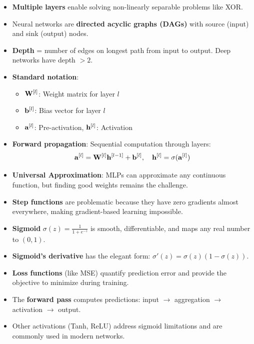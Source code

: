 \begin{itemize}
    \item \textbf{Multiple layers} enable solving non-linearly separable problems like XOR.
    
    \item Neural networks are \textbf{directed acyclic graphs (DAGs)} with source (input) and sink (output) nodes.
    
    \item \textbf{Depth} = number of edges on longest path from input to output. Deep networks have depth $> 2$.
    
    \item \textbf{Standard notation}:
    \begin{itemize}
        \item $\mathbf{W}^{[l]}$: Weight matrix for layer $l$
        \item $\mathbf{b}^{[l]}$: Bias vector for layer $l$
        \item $\mathbf{a}^{[l]}$: Pre-activation, $\mathbf{h}^{[l]}$: Activation
    \end{itemize}
    
    \item \textbf{Forward propagation}: Sequential computation through layers:
    \[
    \mathbf{a}^{[l]} = \mathbf{W}^{[l]} \mathbf{h}^{[l-1]} + \mathbf{b}^{[l]}, \quad \mathbf{h}^{[l]} = \sigma(\mathbf{a}^{[l]})
    \]
    
    \item \textbf{Universal Approximation}: MLPs can approximate any continuous function, but finding good weights remains the challenge.
    
    \item \textbf{Step functions} are problematic because they have zero gradients almost everywhere, making gradient-based learning impossible.
    
    \item \textbf{Sigmoid} $\sigma(z) = \frac{1}{1+e^{-z}}$ is smooth, differentiable, and maps any real number to $(0,1)$.
    
    \item \textbf{Sigmoid's derivative} has the elegant form: $\sigma'(z) = \sigma(z)(1-\sigma(z))$.
    
    \item \textbf{Loss functions} (like MSE) quantify prediction error and provide the objective to minimize during training.
    
    \item The \textbf{forward pass} computes predictions: input $\rightarrow$ aggregation $\rightarrow$ activation $\rightarrow$ output.
    
    \item Other activations (Tanh, ReLU) address sigmoid limitations and are commonly used in modern networks.
\end{itemize}

